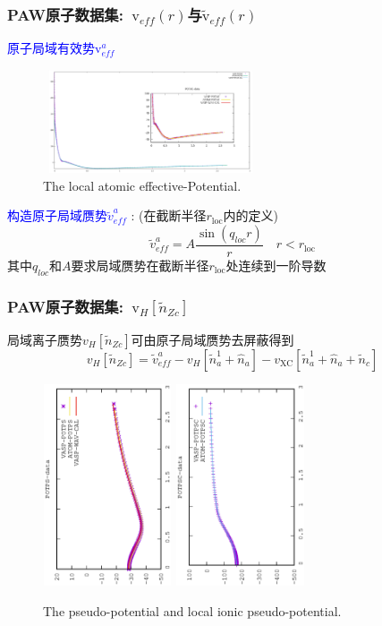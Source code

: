 \frame
{
	\frametitle{\textrm{PAW}原子数据集:~$\mathrm{v}_{e\!f\!f}(r)$与$\tilde{\mathrm{v}}_{e\!f\!f}(r)$}
	\textcolor{blue}{原子局域有效势$\mathrm{v}_{e\!f\!f}^a$}
\begin{figure}[h!]
\vskip -0.17in
\centering
\includegraphics[width=2.5in,height=1.2in,viewport=0 0 1600 800, clip]{Figures/POTAE-full-dat.pdf}
\caption{\tiny \textrm{The local atomic effective-Potential.}}%
\label{local_atomic_PP}
\end{figure}
	\textcolor{blue}{构造原子局域赝势$\tilde v_{e\!f\!f}^a$}%
	:%
	(在截断半径$r_{\mathrm{loc}}$内的定义)
	$$\tilde v_{e\!f\!f}^a=A\dfrac{\sin(q_{loc}r)}r\quad r<r_{\mathrm{loc}}$$
	其中$q_{loc}$和$A$要求局域赝势在截断半径$r_{\mathrm{loc}}$处连续到一阶导数
}

\frame
{
	\frametitle{\textrm{PAW}原子数据集:~$\mathrm{v}_H[\tilde n_{Zc}]$}
	局域离子赝势$v_H[\tilde n_{Zc}]$可由原子局域赝势去屏蔽得到
	$$v_H[\tilde n_{Zc}]=\tilde v_{e\!f\!f}^a-v_H[\tilde n_a^1+\hat n_a]-v_{\mathrm{XC}}[\tilde n_a^1+\hat n_a+\tilde n_c]$$
\begin{figure}[h!]
\vskip -0.5in
\centering
\hspace*{-0.1in}
\includegraphics[width=1.5in,height=2.35in,viewport=0 0 350 550, angle=-90, clip]{Figures/POTPS-data.eps}
\hspace*{-0.7in}
\includegraphics[height=2.35in,width=1.5in,viewport=0 0 350 550, angle=-90, clip]{Figures/POTPSC-data.eps}
\caption{\tiny \textrm{The pseudo-potential and local ionic pseudo-potential.}}%
\label{pseudo_potential}
\end{figure}
}

